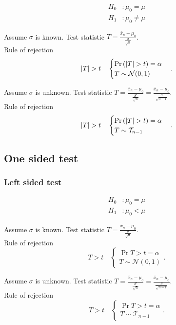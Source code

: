 \documentclass{report}
\begin{document}
\begin{align*}
	H_0 & : \mu_0 = \mu    \\
	H_1 & : \mu_0 \neq \mu
\end{align*}

\begin{itemize}
	\ii Assume $\sigma$ is known. Test statistic $T = \frac{\bar{x}_n - \mu_0}{\frac{\sigma}{\sqrt{n}}} $.\\

	Rule of rejection
	\[
		\lt|T\rt| > t \quad \begin{cases}
			\Pr{|T|>t} = \alpha \\
			T\sim \mathcal{N}(0,1)
		\end{cases}
		.\]

	\ii Assume $\sigma$ is unknown. Test statistic $T = \frac{\bar{x}_n - \mu_0}{\frac{S'}{\sqrt{n}}} = \frac{\bar{x}_n - \mu_0}{\frac{S}{\sqrt{n-1}}}$.\\

	Rule of rejection
	\[
		\lt|T\rt| > t \quad \begin{cases}
			\Pr{|T|>t} = \alpha \\
			T\sim \mathcal{T}_{n-1}
		\end{cases}
		.\]

\end{itemize}

\subsection{One sided test}

\subsubsection{Left sided test}

\begin{align*}
	H_0 & : \mu_0 = \mu \\
	H_1 & : \mu_0 < \mu
\end{align*}

\begin{itemize}
	\ii Assume $\sigma$ is known. Test statistic $T = \frac{\bar{x}_n - \mu_0}{\frac{\sigma}{\sqrt{n}}} $.\\

	Rule of rejection
	\[
		T > t \quad \begin{cases}
			\Pr{T>t} = \alpha \\
			T\sim \mathcal{N}(0,1)
		\end{cases}
		.\]

	\ii Assume $\sigma$ is unknown. Test statistic $T = \frac{\bar{x}_n - \mu_0}{\frac{S'}{\sqrt{n}}} = \frac{\bar{x}_n - \mu_0}{\frac{S}{\sqrt{n-1}}}$.\\

	Rule of rejection
	\[
		T > t \quad \begin{cases}
			\Pr{T>t} = \alpha \\
			T\sim \mathcal{T}_{n-1}
		\end{cases}
		.\]
\end{itemize}
\end{document}
